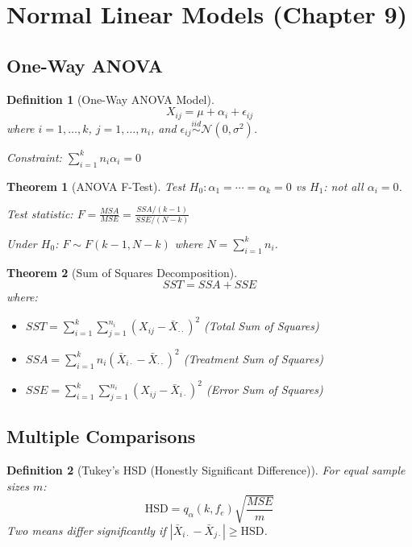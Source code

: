 \documentclass[12pt,a4paper]{amsart}
\newtheorem{theorem}{Theorem}[section]
\newtheorem{definition}{Definition}[section]
\theoremstyle{remark}
\begin{document}
\section{Normal Linear Models (Chapter 9)}

\subsection{One-Way ANOVA}

\begin{definition}[One-Way ANOVA Model]
$$X_{ij} = \mu + \alpha_i + \epsilon_{ij}$$
where $i = 1, \ldots, k$, $j = 1, \ldots, n_i$, and $\epsilon_{ij} \stackrel{iid}{\sim} \mathcal{N}(0, \sigma^2)$.

Constraint: $\sum_{i=1}^k n_i \alpha_i = 0$
\end{definition}

\begin{theorem}[ANOVA F-Test]
Test $H_0: \alpha_1 = \cdots = \alpha_k = 0$ vs $H_1$: not all $\alpha_i = 0$.

Test statistic: $F = \frac{MSA}{MSE} = \frac{SSA/(k-1)}{SSE/(N-k)}$

Under $H_0$: $F \sim F(k-1, N-k)$ where $N = \sum_{i=1}^k n_i$.
\end{theorem}

\begin{theorem}[Sum of Squares Decomposition]
$$SST = SSA + SSE$$
where:
\begin{itemize}
\item $SST = \sum_{i=1}^k \sum_{j=1}^{n_i} (X_{ij} - \bar{X}_{\cdot\cdot})^2$ (Total Sum of Squares)
\item $SSA = \sum_{i=1}^k n_i (\bar{X}_{i\cdot} - \bar{X}_{\cdot\cdot})^2$ (Treatment Sum of Squares)
\item $SSE = \sum_{i=1}^k \sum_{j=1}^{n_i} (X_{ij} - \bar{X}_{i\cdot})^2$ (Error Sum of Squares)
\end{itemize}
\end{theorem}

\subsection{Multiple Comparisons}

\begin{definition}[Tukey's HSD (Honestly Significant Difference)]
For equal sample sizes $m$:
$$\text{HSD} = q_{\alpha}(k, f_e) \sqrt{\frac{MSE}{m}}$$
Two means differ significantly if $|\bar{X}_{i\cdot} - \bar{X}_{j\cdot}| \geq \text{HSD}$.
\end{definition}
\end{document}
